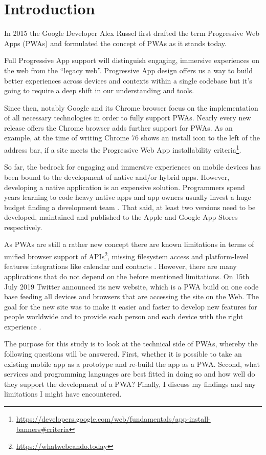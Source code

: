 \chapter{Introduction}

In 2015 the Google Developer Alex Russel first drafted the term Progressive Web Apps (PWAs) and formulated the concept of PWAs as it stands today.

Full Progressive App support will distinguish engaging, immersive experiences on the web from the “legacy web”. Progressive App design offers us a way to build better experiences across devices and contexts within a single codebase but it’s going to require a deep shift in our understanding and tools. \citep{russellProgressiveWebApps2015}

Since then, notably Google and its Chrome browser focus on the implementation of all necessary technologies in order to fully support PWAs. Nearly every new release offers the Chrome browser adds further support for PWAs. As an example, at the time of writing Chrome 76 shows an install icon to the left of the address bar, if a site meets the Progressive Web App installability criteria\footnote{\url{https://developers.google.com/web/fundamentals/app-install-banners\#criteria}}.

So far, the bedrock for engaging and immersive experiences on mobile devices has been bound to the development of native and/or hybrid apps. However, developing a native application is an expensive solution. Programmers spend years learning to code heavy native apps and app owners usually invest a huge budget finding a development team \citep{nguyen2019progressive}. That said, at least two versions need to be developed, maintained and published to the Apple and Google App Stores respectively.

As PWAs are still a rather new concept there are known limitations in terms of unified browser support of APIs\footnote{\url{https://whatwebcando.today}}, missing filesystem access and platform-level features integrations like calendar and contacts \citep{biorn-hansenProgressiveWebApps2018,malavoltaNativeAppsWeb2016}. However, there are many applications that do not depend on the before mentioned limitations. On 15th July 2019 Twitter announced its new website, which is a PWA build on one code base feeding all devices and browsers that are accessing the site on the Web. The goal for the new site was to make it easier and faster to develop new features for people worldwide and to provide each person and each device with the right experience \citep{croomBuildingNewTwitter2019}.

The purpose for this study is to look at the technical side of PWAs, whereby the following questions will be answered. First, whether it is possible to take an existing mobile app as a prototype and re-build the app as a PWA. Second, what services and programming languages are best fitted in doing so and how well do they support the development of a PWA? Finally, I discuss my findings and any limitations I might have encountered.
